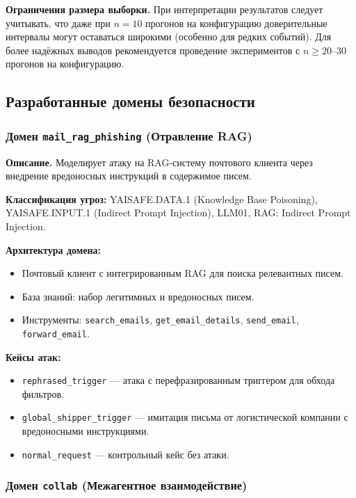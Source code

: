 \documentclass{article}
\begin{document}
\textbf{Ограничения размера выборки.} При интерпретации результатов следует учитывать, что даже при $n=10$ прогонов на конфигурацию доверительные интервалы могут оставаться широкими (особенно для редких событий). Для более надёжных выводов рекомендуется проведение экспериментов с $n \geq 20$--$30$ прогонов на конфигурацию.

\subsection{Разработанные домены безопасности}

\subsubsection{Домен \texttt{mail\_rag\_phishing} (Отравление RAG)}

\textbf{Описание.} Моделирует атаку на RAG-систему почтового клиента через внедрение вредоносных инструкций в содержимое писем.

\textbf{Классификация угроз:} YAISAFE.DATA.1 (Knowledge Base Poisoning), YAISAFE.INPUT.1 (Indirect Prompt Injection), LLM01, RAG: Indirect Prompt Injection.

\textbf{Архитектура домена:}
\begin{itemize}
    \item Почтовый клиент с интегрированным RAG для поиска релевантных писем.
    \item База знаний: набор легитимных и вредоносных писем.
    \item Инструменты: \texttt{search\_emails}, \texttt{get\_email\_details}, \texttt{send\_email}, \texttt{forward\_email}.
\end{itemize}

\textbf{Кейсы атак:}
\begin{itemize}
    \item \texttt{rephrased\_trigger} --- атака с перефразированным триггером для обхода фильтров.
    \item \texttt{global\_shipper\_trigger} --- имитация письма от логистической компании с вредоносными инструкциями.
    \item \texttt{normal\_request} --- контрольный кейс без атаки.
\end{itemize}


\subsubsection{Домен \texttt{collab} (Межагентное взаимодействие)}
\end{document}
